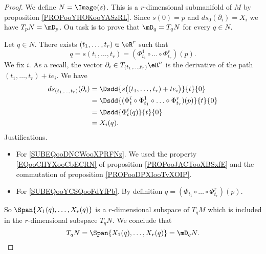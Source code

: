 \begin{proof}
	We define \( N=\Image(s)\). This is a \( r\)-dimensional submanifold of \( M\) by proposition \ref{PROPooYHOKooYASzRL}. Since \( s(0)=p\) and \( ds_0(\partial_i)=X_i\) we have \( T_pN=\mD_p\). Ou task is to prove that \( \mD_q=T_qN\) for every \( q\in N\).

	Let \( q\in N\). There exists \( (t_1,\ldots, t_r)\in \eR^r\) such that
	\begin{equation}
		q=s(t_1,\ldots, t_r)=(\Phi_{t_1}^1\circ \ldots\circ\Phi_{t_r}^r)(p).
	\end{equation}
	We fix \( i\). As a recall, the vector \( \partial_i\in T_{(t_1,\ldots, t_r)}\eR^n\) is the derivative of the path \( (t_1,\ldots, t_r)+te_i\). We have
	\begin{subequations}
		\begin{align}
			ds_{(t_1,\ldots, t_r)}(\partial_i) & =\Dsdd{ s\big( (t_1,\ldots, t_r)+te_i \big) }{t}{0}                                                           \\
			                                   & =\Dsdd{ (\Phi_t^i\circ\Phi_{t_1}^1\circ\ldots\circ\Phi_{t_r}^r)(p)    }{t}{0}     \label{SUBEQooDNCWooXPRFNz} \\
			                                   & =\Dsdd{ \Phi_t^i(q) }{t}{0}        \label{SUBEQooYCSQooFdYfPb}                                                \\
			                                   & =X_i(q).
		\end{align}
	\end{subequations}
	Justifications.
	\begin{itemize}
		\item For \eqref{SUBEQooDNCWooXPRFNz}. We used the property \eqref{EQooCHYXooCbECRN} of proposition \ref{PROPooJACTooXBSxfE} and the commutation of proposition \ref{PROPooDPXIooTvXOIP}.
		\item For \eqref{SUBEQooYCSQooFdYfPb}. By definition \( q=(\Phi_{t_1}\circ\ldots\circ\Phi_{t_r}^r)(p)\).
	\end{itemize}
	So \( \Span\{ X_1(q),\ldots, X_r(q) \}\) is a \( r\)-dimensional subspace of \( T_qM\) which is included in the \( r\)-dimensional subspace \( T_qN\). We conclude that
	\begin{equation}
		T_qN=\Span\{ X_1(q),\ldots, X_r(q) \}=\mD_qN.
	\end{equation}
\end{proof}


